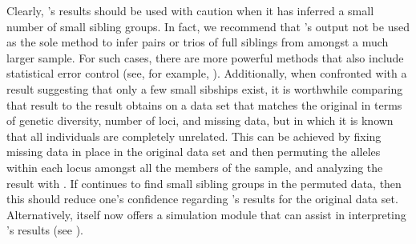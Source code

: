 Clearly, \colony{}'s results should be used with caution when it has inferred a small number of 
small sibling groups.  In fact, we recommend that \colony{}'s output not be used as the sole method 
to infer pairs or trios of full siblings from amongst a much larger sample. For such cases, there are 
more powerful methods that also include statistical error control (see, for example, 
\citealt{almudevar01b}).  Additionally, when confronted with a \colony{} result suggesting that only a 
few small sibships exist, it is worthwhile comparing that result to the result \colony{} obtains on a 
data set that matches the original in terms of genetic diversity, number of loci, and missing data, but 
in which it is known that all individuals are completely unrelated.  This can be achieved by fixing 
missing data in place in the original data set and then permuting the alleles within each locus amongst 
all the members of the sample, and analyzing the result with \colony{}. If \colony{} continues to find 
small sibling groups in the permuted data, then this should reduce one's confidence
regarding \colony{}'s results for 
the original data set.  Alternatively, \colony{} 
itself now offers a simulation module that can assist in interpreting 
\colony{}'s results (see \citealt{Wang2013simulation}).

